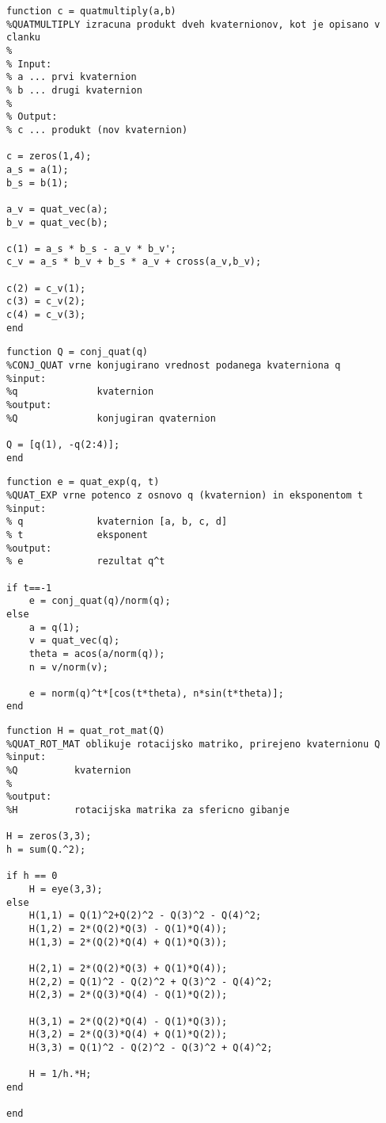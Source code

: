 \documentclass[12pt,a4paper,twoside]{article}
\theoremstyle{definition} %
\theoremstyle{plain} %
\numberwithin{equation}{section}  %
\begin{document}
\begin{lstlisting}[caption = {quatmultiply}]
function c = quatmultiply(a,b)
%QUATMULTIPLY izracuna produkt dveh kvaternionov, kot je opisano v clanku
%
% Input:
% a ... prvi kvaternion
% b ... drugi kvaternion
%
% Output:
% c ... produkt (nov kvaternion)

c = zeros(1,4);
a_s = a(1);
b_s = b(1);

a_v = quat_vec(a);
b_v = quat_vec(b);

c(1) = a_s * b_s - a_v * b_v';
c_v = a_s * b_v + b_s * a_v + cross(a_v,b_v);

c(2) = c_v(1);
c(3) = c_v(2);
c(4) = c_v(3);
end
\end{lstlisting}

\begin{lstlisting}[caption = {conj\_quat}]
function Q = conj_quat(q)
%CONJ_QUAT vrne konjugirano vrednost podanega kvaterniona q
%input:
%q              kvaternion  
%output:
%Q              konjugiran qvaternion

Q = [q(1), -q(2:4)];
end
\end{lstlisting}

\begin{lstlisting}[caption = {quat\_exp}]
function e = quat_exp(q, t)
%QUAT_EXP vrne potenco z osnovo q (kvaternion) in eksponentom t
%input:
% q             kvaternion [a, b, c, d]
% t             eksponent
%output:
% e             rezultat q^t

if t==-1
    e = conj_quat(q)/norm(q);
else
    a = q(1);
    v = quat_vec(q);
    theta = acos(a/norm(q));
    n = v/norm(v);

    e = norm(q)^t*[cos(t*theta), n*sin(t*theta)];
end
\end{lstlisting}

\begin{lstlisting}[caption = {quat\_rot\_mat}]
function H = quat_rot_mat(Q)
%QUAT_ROT_MAT oblikuje rotacijsko matriko, prirejeno kvaternionu Q
%input:
%Q          kvaternion
%
%output:
%H          rotacijska matrika za sfericno gibanje

H = zeros(3,3);
h = sum(Q.^2);

if h == 0
    H = eye(3,3);
else
    H(1,1) = Q(1)^2+Q(2)^2 - Q(3)^2 - Q(4)^2;
    H(1,2) = 2*(Q(2)*Q(3) - Q(1)*Q(4));
    H(1,3) = 2*(Q(2)*Q(4) + Q(1)*Q(3));

    H(2,1) = 2*(Q(2)*Q(3) + Q(1)*Q(4));
    H(2,2) = Q(1)^2 - Q(2)^2 + Q(3)^2 - Q(4)^2;
    H(2,3) = 2*(Q(3)*Q(4) - Q(1)*Q(2));

    H(3,1) = 2*(Q(2)*Q(4) - Q(1)*Q(3));
    H(3,2) = 2*(Q(3)*Q(4) + Q(1)*Q(2));
    H(3,3) = Q(1)^2 - Q(2)^2 - Q(3)^2 + Q(4)^2;

    H = 1/h.*H;  
end

end
\end{lstlisting}
\end{document}
